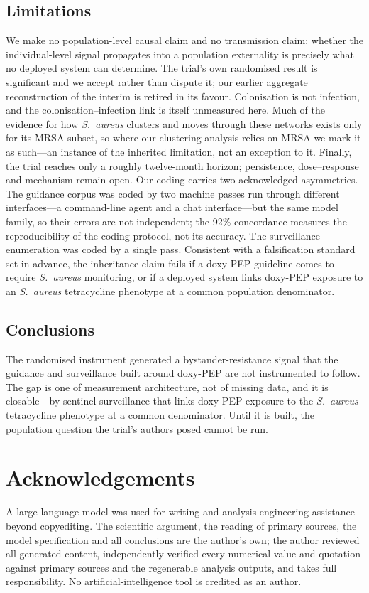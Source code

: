 \documentclass[12pt,a4paper]{article}
\newcommand{\sa}{\emph{S.~aureus}}
\begin{document}
\subsection*{Limitations}
We make no population-level causal claim and no transmission claim: whether the
individual-level signal propagates into a population externality is precisely what
no deployed system can determine. The trial's own randomised result is
significant and we accept rather than dispute it; our earlier aggregate
reconstruction of the interim is retired in its favour. Colonisation is not
infection, and the colonisation--infection link is itself unmeasured here. Much of
the evidence for how \sa{} clusters and moves through these networks exists only
for its MRSA subset, so where our clustering analysis relies on MRSA we mark it as
such---an instance of the inherited limitation, not an exception to it. Finally,
the trial reaches only a roughly twelve-month horizon; persistence, dose--response
and mechanism remain open. Our coding carries two acknowledged asymmetries. The guidance corpus was coded by
two machine passes run through different interfaces---a command-line agent and a
chat interface---but the same model family, so their errors are not independent;
the 92\% concordance measures the reproducibility of the coding protocol, not its
accuracy. The surveillance enumeration was coded by a single pass. Consistent with a
falsification standard set in advance, the inheritance claim fails if a doxy-PEP
guideline comes to require
\sa{} monitoring, or if a deployed system links doxy-PEP exposure to an \sa{}
tetracycline phenotype at a common population denominator.

\subsection*{Conclusions}
The randomised instrument generated a bystander-resistance signal that the
guidance and surveillance built around doxy-PEP are not instrumented to follow.
The gap is one of measurement architecture, not of missing data, and it is
closable---by sentinel surveillance that links doxy-PEP exposure to the \sa{}
tetracycline phenotype at a common denominator. Until it is built, the population
question the trial's authors posed cannot be run.

\section*{Acknowledgements}
A large language model was used for writing and analysis-engineering assistance
beyond copyediting. The scientific argument, the reading of primary sources, the
model specification and all conclusions are the author's own; the author reviewed
all generated content, independently verified every numerical value and quotation
against primary sources and the regenerable analysis outputs, and takes full
responsibility. No artificial-intelligence tool is credited as an author.
\end{document}

